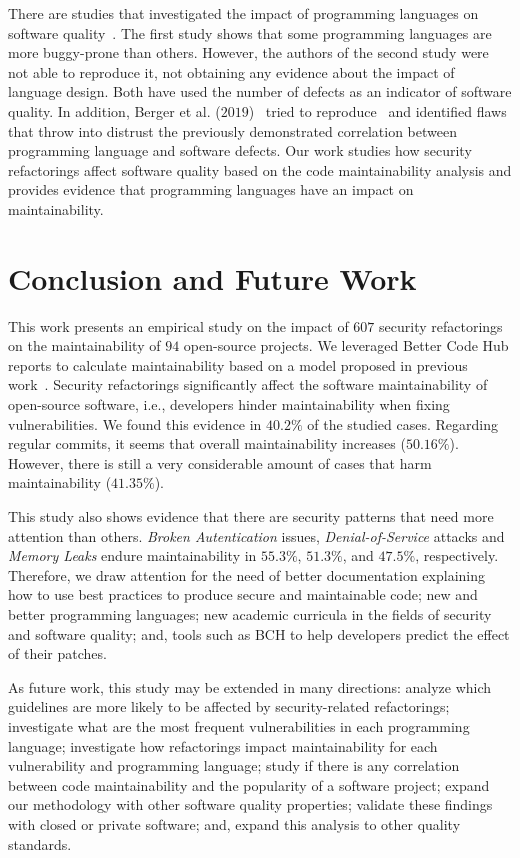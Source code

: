 \documentclass[sigconf,review]{acmart}
\begin{document}
There are studies that investigated the impact of programming languages on software
quality~\cite{Ray:2014:LSS:2635868.2635922,Ray:2017:LSP:3144574.3126905}. The first
study shows that some programming languages are more buggy-prone than others. However,
the authors of the second study were not able to reproduce it, not obtaining any
evidence about the impact of language design. Both have used the number of
defects as an indicator of software quality. In addition,
Berger et al. ($2019$)~\cite{2019arXiv190110220B} tried to reproduce~\cite{Ray:2014:LSS:2635868.2635922,
Ray:2017:LSP:3144574.3126905} and identified flaws that throw into distrust the previously demonstrated
correlation between programming language and software defects. Our work studies how
security refactorings affect software quality based on the code maintainability
analysis and provides evidence that programming languages have an impact on
maintainability.

\section{Conclusion and Future Work}\label{sec:conclusions}

This work presents an empirical study on the impact of $607$ security
refactorings on the maintainability of $94$ open-source projects. We leveraged
Better Code Hub reports to calculate maintainability based on a model proposed in previous work~\cite{Olivari:2018}. Security refactorings 
significantly affect the software maintainability of open-source software, i.e., 
developers hinder maintainability when fixing vulnerabilities. We found this evidence in
$40.2\%$ of the studied cases. Regarding regular commits, it seems that overall
maintainability increases ($50.16\%$). However, there is still a very
considerable amount of cases that harm maintainability ($41.35\%$).

This study also shows evidence that there are security patterns that need more
attention than others. \emph{Broken Autentication} issues,
\emph{Denial-of-Service} attacks and \emph{Memory Leaks} endure maintainability
in $55.3\%$, $51.3\%$, and $47.5\%$, respectively. Therefore, we draw attention
for the need of better documentation explaining how to use best practices to
produce secure and maintainable code; new and better programming languages; new
academic curricula in the fields of security and software quality; and, tools
such as BCH to help developers predict the effect of their patches.

As future work, this study may be extended in many directions: analyze which
guidelines are more likely to be affected by security-related refactorings;
investigate what are the most frequent vulnerabilities in each programming
language; investigate how refactorings impact maintainability for each
vulnerability and programming language;
study if there is any correlation between code maintainability and
the popularity of a software project; expand our methodology with other
software quality properties; validate these findings with closed or private
software; and, expand this analysis to other quality standards.
\end{document}
